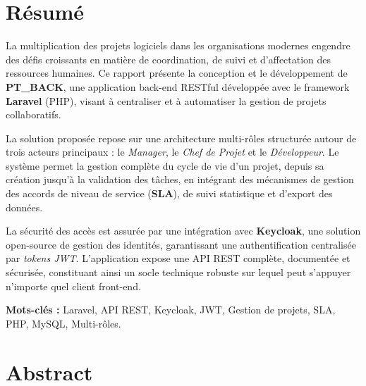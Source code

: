 
\chapter*{Résumé}
\thispagestyle{fancy}

\begin{mdframed}[linecolor=emsiRed, linewidth=1.5pt, backgroundcolor=emsiGray, innertopmargin=12pt, innerbottommargin=12pt, innerleftmargin=15pt, innerrightmargin=15pt]
La multiplication des projets logiciels dans les organisations modernes engendre des défis
croissants en matière de coordination, de suivi et d'affectation des ressources humaines.
Ce rapport présente la conception et le développement de \textbf{PT\_BACK}, une application back-end
RESTful développée avec le framework \textbf{Laravel} (PHP), visant à centraliser et à automatiser
la gestion de projets collaboratifs.

\vspace{0.4cm}

La solution proposée repose sur une architecture multi-rôles structurée autour de trois acteurs
principaux : le \textit{Manager}, le \textit{Chef de Projet} et le \textit{Développeur}. Le système
permet la gestion complète du cycle de vie d'un projet, depuis sa création jusqu'à la validation
des tâches, en intégrant des mécanismes de gestion des accords de niveau de service (\textbf{SLA}),
de suivi statistique et d'export des données.

\vspace{0.4cm}

La sécurité des accès est assurée par une intégration avec \textbf{Keycloak}, une solution open-source
de gestion des identités, garantissant une authentification centralisée par \textit{tokens JWT}.
L'application expose une API REST complète, documentée et sécurisée, constituant ainsi un socle
technique robuste sur lequel peut s'appuyer n'importe quel client front-end.
\end{mdframed}

\vspace{0.5cm}
\noindent\textbf{Mots-clés :} Laravel, API REST, Keycloak, JWT, Gestion de projets, SLA, PHP, MySQL, Multi-rôles.

\vspace{1cm}

\chapter*{Abstract}
\thispagestyle{fancy}

